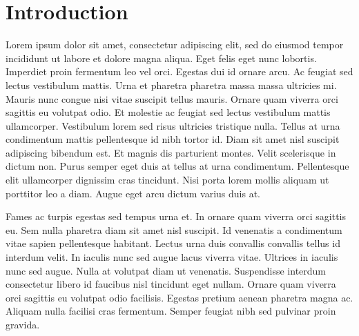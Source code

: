\chapter{Introduction}
\label{chapter:introduction}

Lorem ipsum dolor sit amet, consectetur adipiscing elit, sed do eiusmod tempor incididunt ut labore et dolore magna aliqua. Eget felis eget nunc lobortis. Imperdiet proin fermentum leo vel orci. Egestas dui id ornare arcu. Ac feugiat sed lectus vestibulum mattis. Urna et pharetra pharetra massa massa ultricies mi. Mauris nunc congue nisi vitae suscipit tellus mauris. Ornare quam viverra orci sagittis eu volutpat odio. Et molestie ac feugiat sed lectus vestibulum mattis ullamcorper. Vestibulum lorem sed risus ultricies tristique nulla. Tellus at urna condimentum mattis pellentesque id nibh tortor id. Diam sit amet nisl suscipit adipiscing bibendum est. Et magnis dis parturient montes. Velit scelerisque in dictum non. Purus semper eget duis at tellus at urna condimentum. Pellentesque elit ullamcorper dignissim cras tincidunt. Nisi porta lorem mollis aliquam ut porttitor leo a diam. Augue eget arcu dictum varius duis at.

Fames ac turpis egestas sed tempus urna et. In ornare quam viverra orci sagittis eu. Sem nulla pharetra diam sit amet nisl suscipit. Id venenatis a condimentum vitae sapien pellentesque habitant. Lectus urna duis convallis convallis tellus id interdum velit. In iaculis nunc sed augue lacus viverra vitae. Ultrices in iaculis nunc sed augue. Nulla at volutpat diam ut venenatis. Suspendisse interdum consectetur libero id faucibus nisl tincidunt eget nullam. Ornare quam viverra orci sagittis eu volutpat odio facilisis. Egestas pretium aenean pharetra magna ac. Aliquam nulla facilisi cras fermentum. Semper feugiat nibh sed pulvinar proin gravida.

